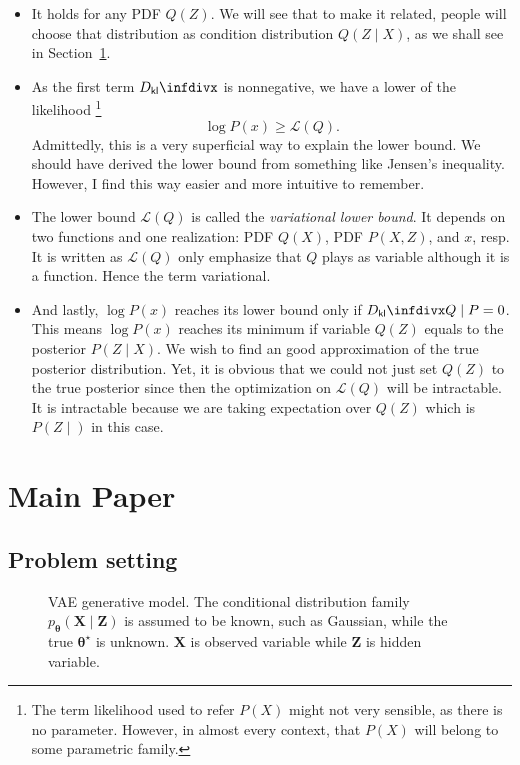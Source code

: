 \documentclass[11pt,a4paper]{article}
\begin{document}
\begin{itemize}
    \item It holds for any PDF $Q(Z)$. We will see that to make it related, people will choose that distribution as condition distribution $Q(Z \mid X)$, as we shall see in Section~\ref{sec:main_paper}.
    \item As the first term $\Dkl{}{}$ is nonnegative, we have a lower of the likelihood \footnote{The term likelihood used to refer $P(X)$ might not very sensible, as there is no parameter. However, in almost every context, that $P(X)$ will belong to some parametric family.}
        \[
        \log P(x) \geq \mathcal{L}(Q).
        \] 
Admittedly, this is a very superficial way to explain the lower bound. We should have derived the lower bound from something like Jensen's inequality. However, I find this way easier and more intuitive to remember.
\item The lower bound $\mathcal{L}(Q)$ is called the \textit{variational lower bound}. It depends on two functions and one realization: PDF $Q(X)$, PDF $P(X, Z)$, and $x$, resp. It is written as $\mathcal{L}(Q)$ only emphasize that $Q$ plays as variable although it is a function. Hence the term variational.
\item And lastly, $\log P(x)$ reaches its lower bound only if $\Dkl{Q \mid P} = 0$. This means $\log P(x)$ reaches its minimum if variable $Q(Z)$ equals to the posterior $P(Z\mid X)$.
{We wish to find an good approximation of the true posterior distribution.}
Yet, it is obvious that we could not just set $Q(Z)$ to the true posterior since then the optimization on $\mathcal{L}(Q)$ will be intractable. {\red It is intractable because we are taking expectation over $Q(Z)$ which is $P(Z \mid )$ in this case.}
\end{itemize}


\section{Main Paper}%
\label{sec:main_paper}

\subsection{Problem setting}%
\label{sub:subsection_nameproblem_setting}
\begin{figure}[ht]
    \centering
    \caption{VAE generative model. The conditional distribution family $p_{\boldsymbol \theta}(\bm{X} \mid \bm{Z})$ is assumed to be known, such as Gaussian, while the true $\boldsymbol \theta^{\star }$ is unknown. $\bm{X}$ is observed variable while $\bm{Z}$ is hidden variable.}
    \label{fig:vae-generative-model}
\end{figure}
\end{document}
